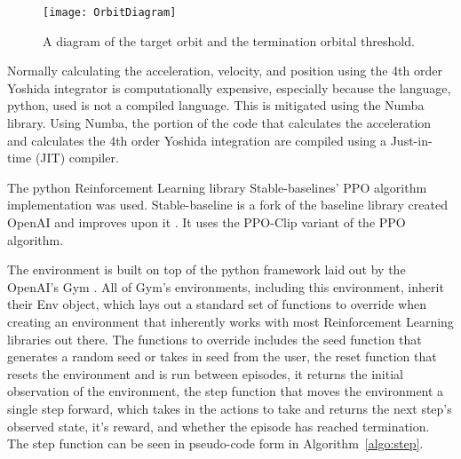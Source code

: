 \begin{figure}
	\centering
	\texttt{[image: OrbitDiagram]}
	\caption{A diagram of the target orbit and the termination orbital threshold.}
	\label{fig:OrbitDiagram}
\end{figure}

Normally calculating the acceleration, velocity, and position using the 4th order Yoshida integrator is computationally expensive, especially because the language, python, used is not a compiled language. This is mitigated using the Numba \cite{10.1145/2833157.2833162} library. Using Numba, the portion of the code that calculates the acceleration and calculates the 4th order Yoshida integration are compiled using a Just-in-time (JIT) compiler.

The python Reinforcement Learning library Stable-baselines' PPO algorithm implementation was used. Stable-baseline is a fork of the baseline library created OpenAI and improves upon it \cite{stable-baselines}. It uses the PPO-Clip variant of the PPO algorithm.

The environment is built on top of the python framework laid out by the OpenAI's Gym \cite{DBLP:journals/corr/BrockmanCPSSTZ16}. All of Gym's environments, including this environment, inherit their Env object, which lays out a standard set of functions to override when creating an environment that inherently works with most Reinforcement Learning libraries out there. The functions to override includes the seed function that generates a random seed or takes in seed from the user, the reset function that resets the environment and is run between episodes, it returns the initial observation of the environment, the step function that moves the environment a single step forward, which takes in the actions to take and returns the next step's observed state, it's reward, and whether the episode has reached termination. The step function can be seen in pseudo-code form in Algorithm~\ref{algo:step}.

